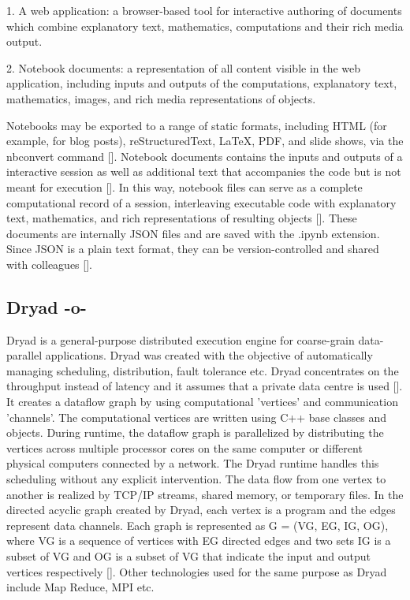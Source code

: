 1. A web application: a browser-based tool for interactive authoring
of documents which combine explanatory text, mathematics, computations
and their rich media output.

2. Notebook documents: a representation of all content visible in the
web application, including inputs and outputs of the computations,
explanatory text, mathematics, images, and rich media representations
of objects.

Notebooks may be exported to a range of static formats, including HTML
(for example, for blog posts), reStructuredText, LaTeX, PDF, and slide
shows, via the nbconvert command [\cite{www-jupyter-3}].  Notebook
documents contains the inputs and outputs of a interactive session as
well as additional text that accompanies the code but is not meant for
execution [\cite{www-jupyter-4}]. In this way, notebook files can
serve as a complete computational record of a session, interleaving
executable code with explanatory text, mathematics, and rich
representations of resulting objects [\cite{www-jupyter-5}]. These
documents are internally JSON files and are saved with the .ipynb
extension. Since JSON is a plain text format, they can be
version-controlled and shared with colleagues [\cite{www-jupyter-6}].

\subsection{Dryad -o-}

Dryad is a general-purpose distributed execution engine for
coarse-grain data-parallel applications. Dryad was created with the
objective of automatically managing scheduling, distribution, fault
tolerance etc. Dryad concentrates on the throughput instead of latency
and it assumes that a private data centre is
used [\cite{www-DryadIntro}].  It creates a dataflow graph by using
computational 'vertices' and communication 'channels'. The
computational vertices are written using C++ base classes and
objects. During runtime, the dataflow graph is parallelized by
distributing the vertices across multiple processor cores on the same
computer or different physical computers connected by a network. The
Dryad runtime handles this scheduling without any explicit
intervention. The data flow from one vertex to another is realized by
TCP/IP streams, shared memory, or temporary files. In the directed
acyclic graph created by Dryad, each vertex is a program and the edges
represent data channels. Each graph is represented as G = (VG, EG, IG,
OG), where VG is a sequence of vertices with EG directed edges and two
sets IG is a subset of VG and OG is a subset of VG that indicate the
input and output vertices respectively [\cite{DryadPaper}]. Other
technologies used for the same purpose as Dryad include Map Reduce,
MPI etc.



